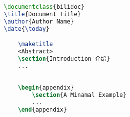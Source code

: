 \begin{lstlisting}[language=LaTeX, caption=A Minamal Example, label=listing:a-minimal-example]
\documentclass{bilidoc}
\title{Document Title}
\author{Author Name}
\date{\today}

    \maketitle
    <Abstract>
    \section{Introduction 介绍}
    ...
    
    
    \begin{appendix}
        \section{A Minamal Example}
        ...
    \end{appendix}

\end{lstlisting}